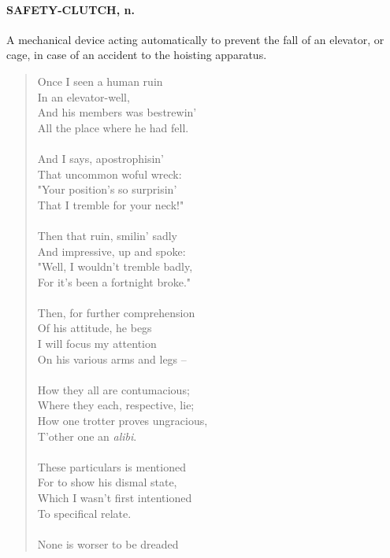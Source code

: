 \documentclass[11pt]{article}
\begin{document}
\paragraph{SAFETY-CLUTCH, n.}  A mechanical device acting automatically to prevent
the fall of an elevator, or cage, in case of an accident to the
hoisting apparatus.

\begin{quote}   Once I seen a human ruin \\
      In an elevator-well, \\
  And his members was bestrewin' \\
      All the place where he had fell. \\
 \\
  And I says, apostrophisin' \\
      That uncommon woful wreck: \\
  "Your position's so surprisin' \\
      That I tremble for your neck!" \\
 \\
  Then that ruin, smilin' sadly \\
      And impressive, up and spoke: \\
  "Well, I wouldn't tremble badly, \\
      For it's been a fortnight broke." \\
 \\
  Then, for further comprehension \\
      Of his attitude, he begs \\
  I will focus my attention \\
      On his various arms and legs -- \\
 \\
  How they all are contumacious; \\
      Where they each, respective, lie; \\
  How one trotter proves ungracious, \\
      T'other one an {\em alibi}. \\
 \\
  These particulars is mentioned \\
      For to show his dismal state, \\
  Which I wasn't first intentioned \\
      To specifical relate. \\
 \\
  None is worser to be dreaded \\

\end{quote}
\end{document}
